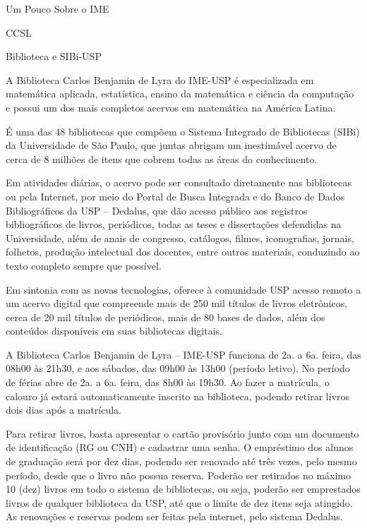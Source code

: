 \begin{secao}{Um Pouco Sobre o IME}
\begin{subsecao}{CCSL}
\end{subsecao}

\begin{subsecao}{Biblioteca e SIBi-USP}

A Biblioteca Carlos Benjamin de Lyra do IME-USP é especializada em matemática aplicada,
estatística, ensino da matemática e ciência da computação e possui um dos mais completos
acervos em matemática na América Latina.

É uma das 48 bibliotecas que compõem o Sistema Integrado de Bibliotecas (SIBi) da
Universidade de São Paulo, que juntas abrigam um inestimável acervo de cerca de 8 milhões
de itens que cobrem todas as áreas do conhecimento.

Em atividades diárias, o acervo pode ser consultado diretamente nas bibliotecas ou pela
Internet, por meio do Portal de Busca Integrada e do Banco de Dados Bibliográficos da USP –
Dedalus, que dão acesso público aos registros bibliográficos de livros, periódicos, todas as
teses e dissertações defendidas na Universidade, além de anais de congresso, catálogos,
filmes, iconografias, jornais, folhetos, produção intelectual dos docentes, entre outros
materiais, conduzindo ao texto completo sempre que possível.

Em sintonia com as novas tecnologias, oferece à comunidade USP acesso remoto a um acervo
digital que compreende mais de 250 mil títulos de livros eletrônicos, cerca de 20 mil títulos de
periódicos, mais de 80 bases de dados, além dos conteúdos disponíveis em suas bibliotecas
digitais.

A Biblioteca Carlos Benjamin de Lyra – IME-USP funciona de 2a. a 6a. feira, das 08h00 às
21h30, e aos sábados, das 09h00 às 13h00 (período letivo). No período de férias abre de 2a. a
6a. feira, das 8h00 às 19h30. Ao fazer a matrícula, o calouro já estará automaticamente
inscrito na biblioteca, podendo retirar livros dois dias após a matrícula.

Para retirar livros, basta apresentar o cartão provisório junto com um documento de
identificação (RG ou CNH) e cadastrar uma senha. O empréstimo dos alunos de graduação será
por dez dias, podendo ser renovado até três vezes, pelo mesmo período, desde que o livro não
possua reserva. Poderão ser retirados no máximo 10 (dez) livros em todo o sistema de
bibliotecas, ou seja, poderão ser emprestados livros de qualquer biblioteca da USP, até que o
limite de dez itens seja atingido. As renovações e reservas podem ser feitas pela internet, pelo
sistema Dedalus.


\end{subsecao}
\end{secao}

